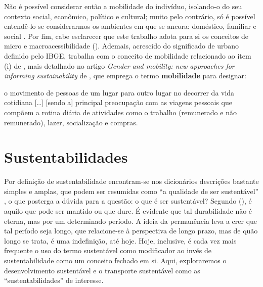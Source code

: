 \clearpage
Não é possível considerar então a mobilidade do indivíduo, isolando-o do seu contexto social, econômico, político e cultural; muito pelo contrário, só é possível entendê-lo se considerarmos os ambientes em que se ancora: doméstico, familiar e social \cite{HANSON2010}. Por fim, cabe esclarecer que este trabalho adota para si os conceitos de micro e macroacessibilidade  (\citeyear{VASCONCELLOS2001}). Ademais, acrescido do significado de urbano definido pelo IBGE, trabalha com o conceito de mobilidade relacionado ao item (i) de , mais detalhado no artigo \emph{Gender and mobility: new approaches for informing sustainability} de , que emprega o termo \textbf{mobilidade} para designar:

\begin{citacao}
o movimento de pessoas de um lugar para outro lugar no decorrer da vida cotidiana [\ldots] [sendo a] principal preocupação com as viagens pessoais que compõem a rotina diária de atividades como o trabalho (remunerado e não remunerado), lazer, socialização e compras.
\cite[p.7]{HANSON2010}
\end{citacao} 


\clearpage
\section{Sustentabilidades}

Por definição de sustentabilidade encontram-se nos dicionários descrições bastante simples e amplas, que podem ser resumidas como ``a qualidade de ser sustentável'' \cite{MICHAELIS2014}, o que posterga a dúvida para a questão: o que é ser sustentável? Segundo  (\citeyear{BLACK2010}), é aquilo que pode ser mantido ou que dure. É evidente que tal durabilidade não é eterna, mas por um determinado período. A ideia da permanência leva a crer que tal período seja longo, que relacione-se à perspectiva de longo prazo, mas de quão longo se trata, é uma indefinição, até hoje. Hoje, inclusive, é cada vez mais frequente o uso do termo sustentável como modificador ao invés de sustentabilidade como um conceito fechado em si. Aqui, exploraremos o desenvolvimento  sustentável e o transporte sustentável como as ``sustentabilidades'' de interesse.

